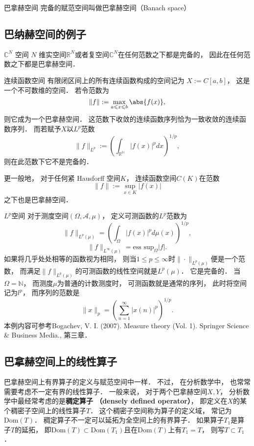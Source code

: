 

\begin{definition}{巴拿赫空间}
完备的赋范空间叫做巴拿赫空间（Banach space）
\end{definition}

\subsection{巴纳赫空间的例子}
\begin{example}{$\mathbb C^N$ 空间}
$N$ 维实空间$\mathbb R^N$或者复空间$\mathbb C^N$在任何范数之下都是完备的， 因此在任何范数之下都是巴拿赫空间．
\end{example}

\begin{example}{连续函数空间}
有限闭区间上的所有连续函数构成的空间记为 $X := C[a, b]$， 这是一个不可数维的空间． 若令范数为
$$
\|{f}\|:= \max_{a \leqslant x \leqslant b} \abs{f(x)},
$$
则它成为一个巴拿赫空间． 这范数下收敛的连续函数序列恰为一致收敛的连续函数序列． 而若赋予$X$以$L^p$范数
$$
\|f\|_{L^p}:=\left(\int_{\mathbb{R^N}}|f(x)|^pdx\right)^{1/p},
$$
则在此范数下它不是完备的．

更一般地， 对于任何紧 Hausforff 空间$K$， 连续函数空间$C(K)$在范数
$$
\|f\|:=\sup_{x\in K}|f(x)|
$$
之下也是巴拿赫空间．
\end{example}

\begin{example}{$L^p$空间}
对于测度空间$(\Omega,\mathcal{A},\mu)$， 定义可测函数的$L^p$范数为
$$
\|f\|_{L^p(\mu)}=\left(\int_\Omega |f(x)|^pd\mu(x)\right)^{1/p},
$$
$$
\|f\|_{L^\infty(\mu)}=\text{ess sup}_{\Omega}|f|.
$$
如果将几乎处处相等的函数视为相同， 则当$1\leq p\leq\infty$时$\|\cdot\|_{L^p(\mu)}$便是一个范数， 而满足$\|f\|_{L^p(\mu)}$的可测函数的线性空间就是$L^p(\mu)$． 它是完备的． 当$\Omega=\mathbb{N}$， 而测度$\mu$为普通的计数测度时， 可测函数就是通常的序列， 此时将空间记为$l^p$， 而序列的范数是
$$
\|x\|_p=\left(\sum_{n=1}^\infty|x(n)|^p\right)^{1/p}.
$$
本例内容可参考Bogachev, V. I. (2007). Measure theory (Vol. 1). Springer Science \& Business Media., 第三章．
\end{example}

\subsection{巴拿赫空间上的线性算子}
巴拿赫空间上有界算子的定义与赋范空间中一样． 不过， 在分析数学中， 也常常需要考虑不一定有界的线性算子． 一般来说， 对于两个巴拿赫空间$X,Y$， 分析数学中最经常考虑的是\textbf{稠定算子 （densely defined operator）}， 即定义在$X$的某个稠密子空间上的线性算子$T$． 这个稠密子空间称为算子的定义域， 常记为$\text{Dom}(T)$． 稠定算子不一定可以延拓为全空间上的有界算子． 如果算子$T_1$是算子$T$的延拓， 即$\text{Dom}(T)\subset \text{Dom}(T_1)$且在$\text{Dom}(T)$上有$T_1=T$， 则写$T\subset T_1$．


